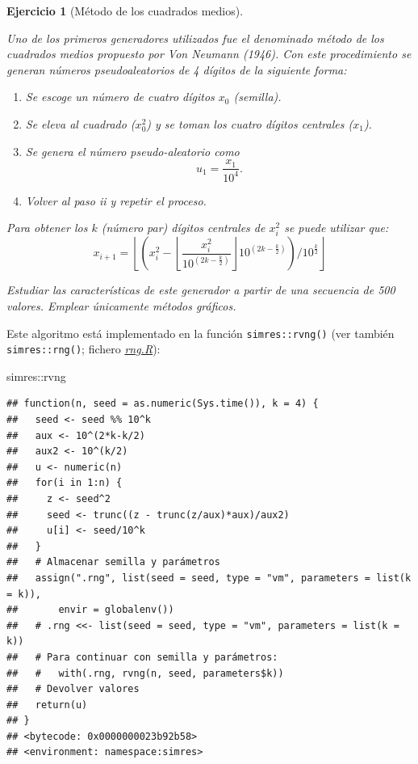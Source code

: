 \documentclass[
]{book}
\newenvironment{Shaded}{\begin{snugshade}}{\end{snugshade}}
\newcommand{\NormalTok}[1]{#1}
\newcommand{\SpecialCharTok}[1]{\textcolor[rgb]{0.00,0.00,0.00}{#1}}
\theoremstyle{break}
\newtheorem{exercise}{Ejercicio}[chapter]
\theoremstyle{nonumberplain}
\begin{document}
\begin{exercise}[Método de los cuadrados medios]
\protect\hypertarget{exr:RANDVN}{}\label{exr:RANDVN}

Uno de los primeros generadores utilizados fue el denominado método de los cuadrados medios propuesto por Von Neumann (1946).
Con este procedimiento se generan números pseudoaleatorios de 4 dígitos de la siguiente forma:

\begin{enumerate}
\def\labelenumi{\roman{enumi}.}
\item
  Se escoge un número de cuatro dígitos \(x_0\) (semilla).
\item
  Se eleva al cuadrado (\(x_0^2\)) y se toman los cuatro dígitos centrales (\(x_1\)).
\item
  Se genera el número pseudo-aleatorio como \[u_1=\frac{x_1}{10^{4}}.\]
\item
  Volver al paso ii y repetir el proceso.
\end{enumerate}

Para obtener los \(k\) (número par) dígitos centrales de \(x_{i}^2\)
se puede utilizar que:
\[x_{i+1}=\left\lfloor \left(  x_{i}^2-\left\lfloor \dfrac{x_{i}^2}{10^{(2k-\frac{k}2)}}\right\rfloor 10^{(2k-\frac{k}2)}\right)
/10^{\frac{k}2}\right\rfloor\]

Estudiar las características de este generador a partir de una secuencia de 500 valores.
Emplear únicamente métodos gráficos.
\end{exercise}

Este algoritmo está implementado en la función \texttt{simres::rvng()} (ver también \texttt{simres::rng()}; fichero \href{R/rng.R}{\emph{rng.R}}):

\begin{Shaded}
\begin{Highlighting}[]
\NormalTok{simres}\SpecialCharTok{::}\NormalTok{rvng}
\end{Highlighting}
\end{Shaded}

\begin{verbatim}
## function(n, seed = as.numeric(Sys.time()), k = 4) {
##   seed <- seed %% 10^k
##   aux <- 10^(2*k-k/2)
##   aux2 <- 10^(k/2)
##   u <- numeric(n)
##   for(i in 1:n) {
##     z <- seed^2
##     seed <- trunc((z - trunc(z/aux)*aux)/aux2)
##     u[i] <- seed/10^k
##   }
##   # Almacenar semilla y parámetros
##   assign(".rng", list(seed = seed, type = "vm", parameters = list(k = k)),
##       envir = globalenv())
##   # .rng <<- list(seed = seed, type = "vm", parameters = list(k = k))
##   # Para continuar con semilla y parámetros:
##   #   with(.rng, rvng(n, seed, parameters$k))
##   # Devolver valores
##   return(u)
## }
## <bytecode: 0x0000000023b92b58>
## <environment: namespace:simres>
\end{verbatim}
\end{document}
